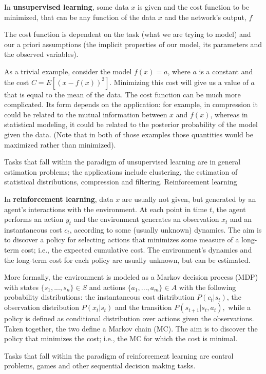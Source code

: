 \documentclass[a4paper,12pt]{article}
\begin{document}
In \textbf{unsupervised learning}, some data $ x $ is given and the cost function to be minimized, that can be any function of the data $ x $ and the network's output, $f$

The cost function is dependent on the task (what we are trying to model) and our a priori assumptions (the implicit properties of our model, its parameters and the observed variables).

As a trivial example, consider the model $f(x) = a$, where $ a $ is a constant and the cost $ C=E[(x - f(x))^2] $. Minimizing this cost will give us a value of $ a $ that is equal to the mean of the data. The cost function can be much more complicated. Its form depends on the application: for example, in compression it could be related to the mutual information between $ x $ and $ f(x) $, whereas in statistical modeling, it could be related to the posterior probability of the model given the data. (Note that in both of those examples those quantities would be maximized rather than minimized).

Tasks that fall within the paradigm of unsupervised learning are in general estimation problems; the applications include clustering, the estimation of statistical distributions, compression and filtering.
Reinforcement learning

In \textbf{reinforcement learning}, data $ x $ are usually not given, but generated by an agent's interactions with the environment. At each point in time $ t $, the agent performs an action $ y_t  $ and the environment generates an observation $ x_t $ and an instantaneous cost $ c_t $, according to some (usually unknown) dynamics. The aim is to discover a policy for selecting actions that minimizes some measure of a long-term cost; i.e., the expected cumulative cost. The environment's dynamics and the long-term cost for each policy are usually unknown, but can be estimated.

More formally, the environment is modeled as a Markov decision process (MDP) with states $ \{s_1,...,s_n\}\in S $ and actions $\{a_1,...,a_m\} \in A $ with the following probability distributions: the instantaneous cost distribution $ P(c_t|s_t) $, the observation distribution $ P(x_t|s_t) $ and the transition $ P(s_{t+1}|s_t, a_t), $ while a policy is defined as conditional distribution over actions given the observations. Taken together, the two define a Markov chain (MC). The aim is to discover the policy that minimizes the cost; i.e., the MC for which the cost is minimal.

Tasks that fall within the paradigm of reinforcement learning are control problems, games and other sequential decision making tasks.
\end{document}
